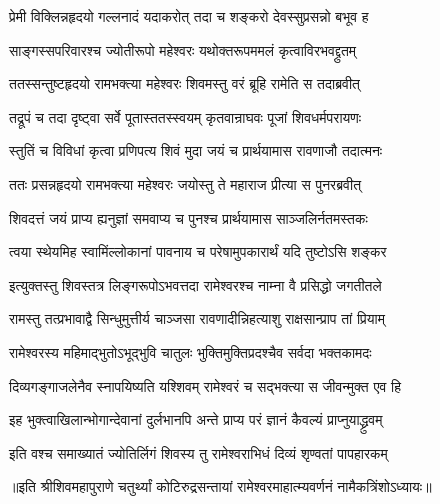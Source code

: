 \twolineshloka
{प्रेमी विक्लिन्नहृदयो गल्लनादं यदाकरोत्} 
{तदा च शङ्करो देवस्सुप्रसन्नो बभूव ह} %

\twolineshloka
{साङ्गस्सपरिवारश्च ज्योतीरूपो महेश्वरः}
{यथोक्तरूपममलं कृत्वाविरभवद्द्रुतम्} %

\twolineshloka
{ततस्सन्तुष्टहृदयो रामभक्त्या महेश्वरः} 
{शिवमस्तु वरं ब्रूहि रामेति स तदाब्रवीत्} %

\twolineshloka
{तद्रूपं च तदा दृष्ट्वा सर्वे पूतास्ततस्स्वयम्} 
{कृतवान्राघवः पूजां शिवधर्मपरायणः} %

\twolineshloka
{स्तुतिं च विविधां कृत्वा प्रणिपत्य शिवं मुदा} 
{जयं च प्रार्थयामास रावणाजौ तदात्मनः} %

\twolineshloka
{ततः प्रसन्नहृदयो रामभक्त्या महेश्वरः} 
{जयोस्तु ते महाराज प्रीत्या स पुनरब्रवीत्} %

\twolineshloka
{शिवदत्तं जयं प्राप्य ह्यनुज्ञां समवाप्य च} 
{पुनश्च प्रार्थयामास साञ्जलिर्नतमस्तकः} %


\twolineshloka
{त्वया स्थेयमिह स्वामिंल्लोकानां पावनाय च} 
{परेषामुपकारार्थं यदि तुष्टोऽसि शङ्कर} %


\twolineshloka
{इत्युक्तस्तु शिवस्तत्र लिङ्गरूपोऽभवत्तदा} 
{रामेश्वरश्च नाम्ना वै प्रसिद्धो जगतीतले} %

\twolineshloka
{रामस्तु तत्प्रभावाद्वै सिन्धुमुत्तीर्य चाञ्जसा}
{रावणादीन्निहत्याशु राक्षसान्प्राप तां प्रियाम्} %

\twolineshloka
{रामेश्वरस्य महिमाद्भुतोऽभूद्भुवि चातुलः} 
{भुक्तिमुक्तिप्रदश्चैव सर्वदा भक्तकामदः} %

\twolineshloka
{दिव्यगङ्गाजलेनैव स्नापयिष्यति यश्शिवम्} 
{रामेश्वरं च सद्भक्त्या स जीवन्मुक्त एव हि} %

\twolineshloka
{इह भुक्त्वाखिलान्भोगान्देवानां दुर्लभानपि} 
{अन्ते प्राप्य परं ज्ञानं कैवल्यं प्राप्नुयाद्ध्रुवम्} %

\twolineshloka
{इति वश्च समाख्यातं ज्योतिर्लिगं शिवस्य तु}
{रामेश्वराभिधं दिव्यं शृण्वतां पापहारकम्} %

॥इति श्रीशिवमहापुराणे चतुर्थ्यां कोटिरुद्रसन्तायां रामेश्वरमाहात्म्यवर्णनं नामैकत्रिंशोऽध्यायः॥

\closesection